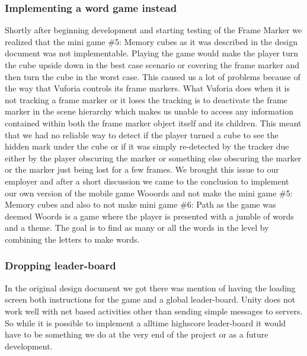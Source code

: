 \subsubsection{Implementing a word game instead}
Shortly after beginning development and starting testing of the \gls{Frame Marker} we realized that the mini game \#5: Memory cubes as it was described in the design document was not implementable. Playing the game would make the player turn the cube upside down in the best case scenario or covering the frame marker and then turn the cube in the worst case. This caused us a lot of problems because of the way that Vuforia controls its frame markers. What Vuforia does when it is not tracking a frame marker or it loses the tracking is to deactivate the frame marker in the scene hierarchy which makes us unable to access any information contained within both the frame marker object itself and its children. This meant that we had no reliable way to detect if the player turned a cube to see the hidden mark under the cube or if it was simply re-detected by the tracker due either by the player obscuring the marker or something else obscuring the marker or the marker just being lost for a few frames. We brought this issue to our employer and after a short discussion we came to the conclusion to implement our own version of the mobile game Wooords and not make the mini game \#5: Memory cubes and also to not make mini game \#6: Path as the game was deemed %
Woords is a game where the player is presented with a jumble of words and a theme. The goal is to find as many or all the words in the level by combining the letters to make words.


\subsubsection{Dropping leader-board}
In the original design document we got there was mention of having the loading screen both instructions for the game and a global leader-board. 
Unity does not work well with net based activities other than sending simple messages to servers.
So while it is possible to implement a alltime highscore leader-board it would have to be something we do at the very end of the project or as a future development.

